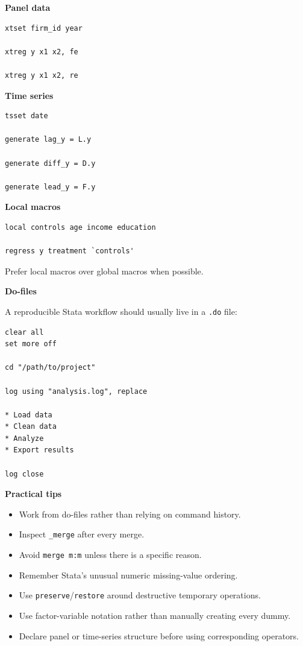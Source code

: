 \documentclass[11pt,letterpaper]{article}
\begin{document}
\textbf{Panel data}

\begin{lstlisting}
xtset firm_id year

xtreg y x1 x2, fe

xtreg y x1 x2, re
\end{lstlisting}

\textbf{Time series}

\begin{lstlisting}
tsset date

generate lag_y = L.y

generate diff_y = D.y

generate lead_y = F.y
\end{lstlisting}

\textbf{Local macros}

\begin{lstlisting}
local controls age income education

regress y treatment `controls'
\end{lstlisting}

Prefer local macros over global macros when possible.

\textbf{Do-files}

A reproducible Stata workflow should usually live in a \texttt{.do} file:

\begin{lstlisting}
clear all
set more off

cd "/path/to/project"

log using "analysis.log", replace

* Load data
* Clean data
* Analyze
* Export results

log close
\end{lstlisting}

\textbf{Practical tips}

\begin{itemize}[leftmargin=*]
    \item Work from do-files rather than relying on command history.
    \item Inspect \texttt{\_merge} after every merge.
    \item Avoid \texttt{merge m:m} unless there is a specific reason.
    \item Remember Stata's unusual numeric missing-value ordering.
    \item Use \texttt{preserve}/\texttt{restore} around destructive temporary
    operations.
    \item Use factor-variable notation rather than manually creating every dummy.
    \item Declare panel or time-series structure before using corresponding
    operators.
\end{itemize}
\end{document}
